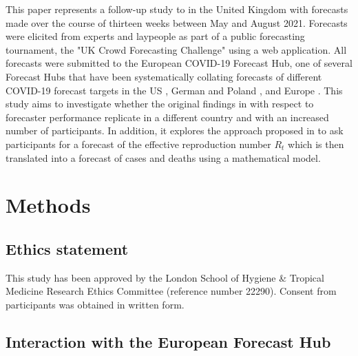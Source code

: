 \documentclass[10pt,a4paper,twocolumn]{article}
\begin{document}
This paper represents a follow-up study to \citet{bosseComparingHumanModelbased2022} in the United Kingdom with forecasts made over the course of thirteen weeks between May and August 2021. Forecasts were elicited from experts and laypeople as part of a public forecasting tournament, the "UK Crowd Forecasting Challenge" using a web application. All forecasts were submitted to the European COVID-19 Forecast Hub, one of several Forecast Hubs that have been systematically collating forecasts of different COVID-19 forecast targets in the US \citep{cramerEvaluationIndividualEnsemble2021}, German and Poland \citep{bracherShorttermForecastingCOVID192021, bracherNationalSubnationalShortterm2021}, and Europe \citep{sherrattPredictivePerformanceMultimodel2022a}. This study aims to investigate whether the original findings in \citet{bosseComparingHumanModelbased2022} with respect to forecaster performance replicate in a different country and with an increased number of participants. In addition, it explores the approach proposed in \citet{bosseComparingHumanModelbased2022} to ask participants for a forecast of the effective reproduction number $R_t$ which is then translated into a forecast of cases and deaths using a mathematical model. 


\section*{Methods}

\subsection*{Ethics statement}
This study has been approved by the London School of Hygiene \& Tropical Medicine Research Ethics Committee (reference number 22290). Consent from participants was obtained in written form.

\subsection*{Interaction with the European Forecast Hub}
\end{document}
